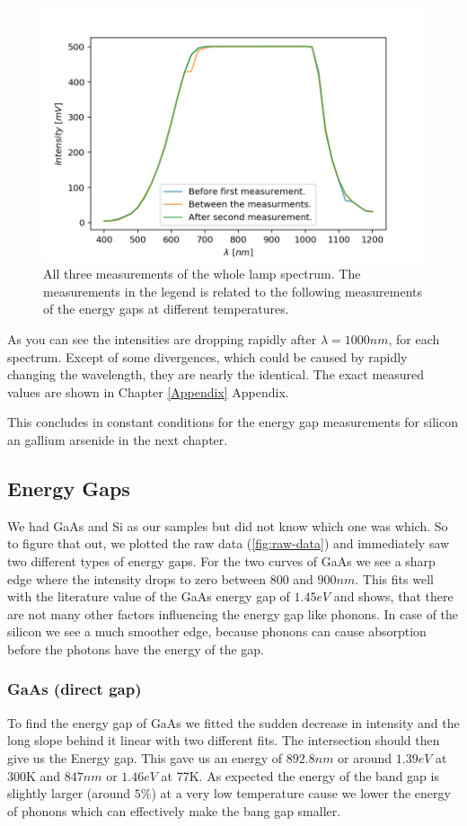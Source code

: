 \documentclass[]{article}
\begin{document}
\begin{figure}[H]
\centering
\includegraphics[width=.8\textwidth]{Plots/All-Lamp-Spectra.png}
\caption{All three measurements of the whole lamp spectrum. The measurements in the legend is related to the following measurements of the energy gaps at different temperatures. }
\label{fig:lamp spectra}
\end{figure} 

As you can see the intensities are dropping rapidly after  $\lambda =1000nm$, for each spectrum. Except of some divergences, which could be caused by rapidly changing the wavelength, they are nearly the identical. The exact measured values are shown in Chapter \ref{Appendix} Appendix.

This concludes in constant conditions for the energy gap measurements for silicon an gallium arsenide in the next chapter.

\subsection{Energy Gaps}
We had GaAs and Si as our samples but did not know which one was which. So to figure that out, we plotted the raw data (\ref{fig:raw-data}) and immediately saw two different types of energy gaps. For the two curves of GaAs we see a sharp edge where the intensity drops to zero between $800$ and $900nm$. This fits well with the literature value of the GaAs energy gap of $1.45eV$ and shows, that there are not many other factors influencing the energy gap like phonons. In case of the silicon we see a much smoother edge, because phonons can cause absorption before the photons have the energy of the gap.
\subsubsection{GaAs (direct gap)}
To find the energy gap of GaAs we fitted the sudden decrease in intensity and the long slope behind it linear with two different fits. The intersection should then give us the Energy gap. This gave us an energy of $892.8nm$ or around $1.39eV$ at 300K and $847nm$ or $1.46eV$ at 77K. As expected the energy of the band gap is slightly larger (around $5\%$) at a very low temperature cause we lower the energy of phonons which can effectively make the bang gap smaller. 
\end{document}

